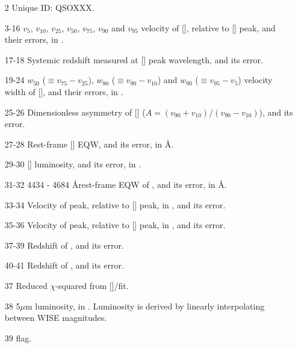 \begin{itemize}
    
  \item[2] Unique ID: QSOXXX.
  
  \item[3-16] $v_{5}$, $v_{10}$, $v_{25}$, $v_{50}$, $v_{75}$, $v_{90}$ and $v_{95}$ velocity of [], relative to [] peak, and their errors, in \kms.  

  \item[17-18] Systemic redshift measured at [] peak wavelength, and its error. 

  \item[19-24] $w_{50}$ ($\equiv v_{75} - v_{25}$), $w_{80}$ ($\equiv v_{90} - v_{10}$) and $w_{90}$ ($\equiv v_{95} - v_{5}$) velocity width of [], and their errors, in \kms.

  \item[25-26] Dimensionless asymmetry of [] ($A = (v_{90} + v_{10}) / (v_{90} - v_{10})$), and its error.  

  \item[27-28] Rest-frame [] EQW, and its error, in \AA.

  \item[29-30] [\ion{O}{III}] luminosity, and its error, in \ergs. 

  \item[31-32] 4434 - 4684 \AA rest-frame EQW of , and its error, in \AA. %

  \item[33-34] Velocity of \hb peak, relative to [] peak, in \kms, and its error. 

  \item[35-36] Velocity of \ha peak, relative to [] peak, in \kms, and its error. 

  \item[37-39] Redshift of \hb, and its error.

  \item[40-41] Redshift of \ha, and its error.

  \item[37] Reduced $\chi$-squared from []/\hb fit. 

  \item[38] 5$\mu$m luminosity, in \ergs. Luminosity is derived by linearly interpolating between WISE magnitudes. 

  \item[39]  flag. 


\end{itemize}
